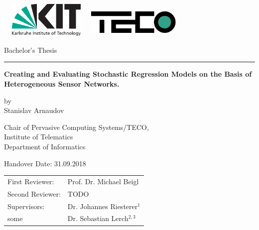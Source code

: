 \documentclass[12pt,a4paper,twoside]{scrartcl}
\numberwithin{equation}{section}
\begin{document}
\boldmath
\nonfrenchspacing

\pagestyle{empty}


\setlength{\parindent}{4em}
\setlength{\parskip}{1em}

\begin{titlepage}

  \begin{center}\large

    {\flushleft\includegraphics[height=17mm, width=45mm]{kit_logo_en.pdf} \hfill}
    \includegraphics[height=15mm, width=45mm]{group_logo.pdf}\quad\null

    \vspace*{1cm}
    {\Large Bachelor's Thesis}\\
    \noindent\hfil\rule{0.4\textwidth}{.4pt}\hfil
    \vspace*{1cm}

    {\bf\huge Creating and Evaluating Stochastic Regression Models on the Basis of Heterogeneous Sensor Networks. \par} %
    \vspace*{5mm}

    by\\
    \vspace*{3mm}
    {\huge{Stanislav Arnaudov}}

    \vspace*{10mm}
    Chair of Pervasive Computing Systems/TECO,\\
    Institute of Telematics\\
    Department of Informatics\\
    \vspace*{15mm}

    Handover Date: 31.09.2018
    \vspace*{10mm}

    
    \begin{tabular}{p{5.5cm}l}
      First Reviewer: &Prof. Dr. Michael Beigl\\
      Second Reviewer: &TODO\\
      Supervisors: &Dr. Johannes Riesterer\(^1\) \\
      some            &Dr. Sebastian Lerch\(^{2,3}\)
    \end{tabular}
    

\end{center}
\end{titlepage}
\end{document}
